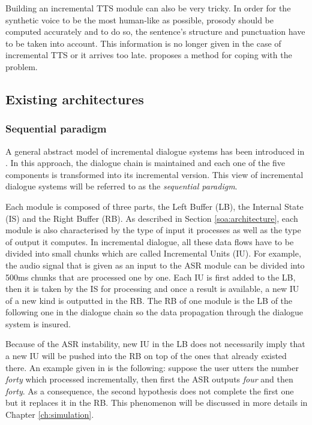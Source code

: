 		Building an incremental TTS module can also be very tricky. In order for the synthetic voice to be the most human-like as possible, prosody should be computed accurately and to do so, the sentence's structure and punctuation have to be taken into account. This information is no longer given in the case of incremental TTS or it arrives too late. \cite{Baumann2014} proposes a method for coping with the problem. 


	\subsection{Existing architectures}
		\subsubsection{Sequential paradigm}
			
			A general abstract model of incremental dialogue systems has been introduced in \cite{Schlangen2011}. In this approach, the dialogue chain is maintained and each one of the five components is transformed into its incremental version. This view of incremental dialogue systems will be referred to as the \textit{sequential paradigm}.
				
			Each module is composed of three parts, the Left Buffer (LB), the Internal State (IS) and the Right Buffer (RB). As described in Section \ref{soa:architecture}, each module is also characterised by the type of input it processes as well as the type of output it computes. In incremental dialogue, all these data flows have to be divided into small chunks which are called Incremental Units (IU). For example, the audio signal that is given as an input to the ASR module can be divided into 500ms chunks that are processed one by one. Each IU is first added to the LB, then it is taken by the IS for processing and once a result is available, a new IU of a new kind is outputted in the RB. The RB of one module is the LB of the following one in the dialogue chain so the data propagation through the dialogue system is insured.
			
			Because of the ASR instability, new IU in the LB does not necessarily imply that a new IU will be pushed into the RB on top of the ones that already existed there. An example given in \cite{Schlangen2011} is the following: suppose the user utters the number \textit{forty} which processed incrementally, then first the ASR outputs \textit{four} and then \textit{forty}. As a consequence, the second hypothesis does not complete the first one but it replaces it in the RB. This phenomenon will be discussed in more details in Chapter \ref{ch:simulation}.
			
